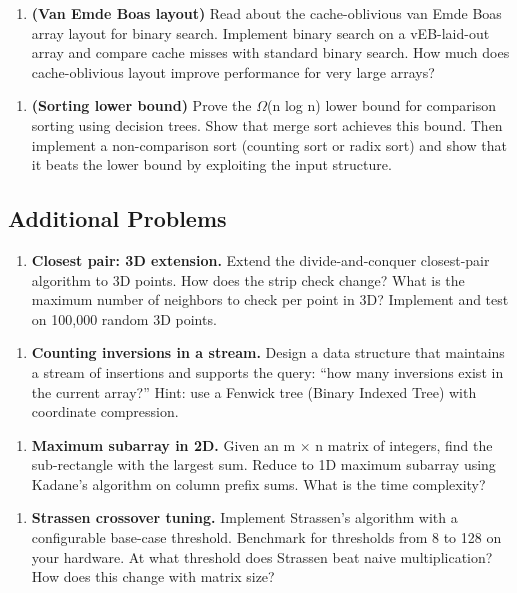 \begin{enumerate}
\item \textbf{(Van Emde Boas layout)} Read about the cache-oblivious van Emde Boas array layout for binary search. Implement binary search on a vEB-laid-out array and compare cache misses with standard binary search. How much does cache-oblivious layout improve performance for very large arrays?
\end{enumerate}

\begin{enumerate}
\item \textbf{(Sorting lower bound)} Prove the $\Omega $(n log n) lower bound for comparison sorting using decision trees. Show that merge sort achieves this bound. Then implement a non-comparison sort (counting sort or radix sort) and show that it beats the lower bound by exploiting the input structure.
\end{enumerate}

\subsection{Additional Problems}

\begin{enumerate}
\item \textbf{Closest pair: 3D extension.} Extend the divide-and-conquer closest-pair algorithm to 3D points. How does the strip check change? What is the maximum number of neighbors to check per point in 3D? Implement and test on 100,000 random 3D points.
\end{enumerate}

\begin{enumerate}
\item \textbf{Counting inversions in a stream.} Design a data structure that maintains a stream of insertions and supports the query: ``how many inversions exist in the current array?'' Hint: use a Fenwick tree (Binary Indexed Tree) with coordinate compression.
\end{enumerate}

\begin{enumerate}
\item \textbf{Maximum subarray in 2D.} Given an m $\times$ n matrix of integers, find the sub-rectangle with the largest sum. Reduce to 1D maximum subarray using Kadane's algorithm on column prefix sums. What is the time complexity?
\end{enumerate}

\begin{enumerate}
\item \textbf{Strassen crossover tuning.} Implement Strassen's algorithm with a configurable base-case threshold. Benchmark for thresholds from 8 to 128 on your hardware. At what threshold does Strassen beat naive multiplication? How does this change with matrix size?
\end{enumerate}

